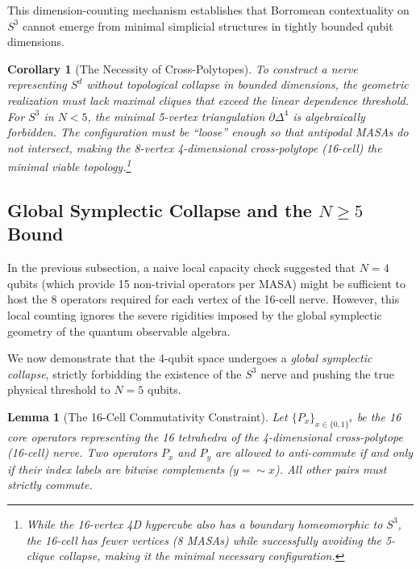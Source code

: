\documentclass[11pt]{article}
\newtheorem{lemma}[theorem]{Lemma}
\newtheorem{corollary}[theorem]{Corollary}
\begin{document}
This dimension-counting mechanism establishes that Borromean contextuality on $S^3$ cannot emerge from minimal simplicial structures in tightly bounded qubit dimensions.

\begin{corollary}[The Necessity of Cross-Polytopes]
\label{cor:cross-polytope}
To construct a nerve representing $S^d$ without topological collapse in bounded dimensions, the geometric realization must lack maximal cliques that exceed the linear dependence threshold. For $S^3$ in $N < 5$, the minimal 5-vertex triangulation $\partial\Delta^4$ is algebraically forbidden. The configuration must be ``loose'' enough so that antipodal MASAs do not intersect, making the 8-vertex 4-dimensional cross-polytope (16-cell) the minimal viable topology.\footnote{While the 16-vertex 4D hypercube also has a boundary homeomorphic to $S^3$, the 16-cell has fewer vertices (8 MASAs) while successfully avoiding the 5-clique collapse, making it the minimal necessary configuration.}
\end{corollary}

\subsection{Global Symplectic Collapse and the $N \ge 5$ Bound}

In the previous subsection, a naive local capacity check suggested that $N=4$ qubits (which provide 15 non-trivial operators per MASA) might be sufficient to host the 8 operators required for each vertex of the 16-cell nerve. However, this local counting ignores the severe rigidities imposed by the global symplectic geometry of the quantum observable algebra.

We now demonstrate that the 4-qubit space undergoes a \emph{global symplectic collapse}, strictly forbidding the existence of the $S^3$ nerve and pushing the true physical threshold to $N=5$ qubits.

\begin{lemma}[The 16-Cell Commutativity Constraint]
\label{lem:16cell-commute}
Let $\{P_x\}_{x \in \{0,1\}^4}$ be the 16 core operators representing the 16 tetrahedra of the 4-dimensional cross-polytope (16-cell) nerve. Two operators $P_x$ and $P_y$ are allowed to anti-commute if and only if their index labels are bitwise complements ($y = \sim x$). All other pairs must strictly commute.
\end{lemma}
\end{document}
